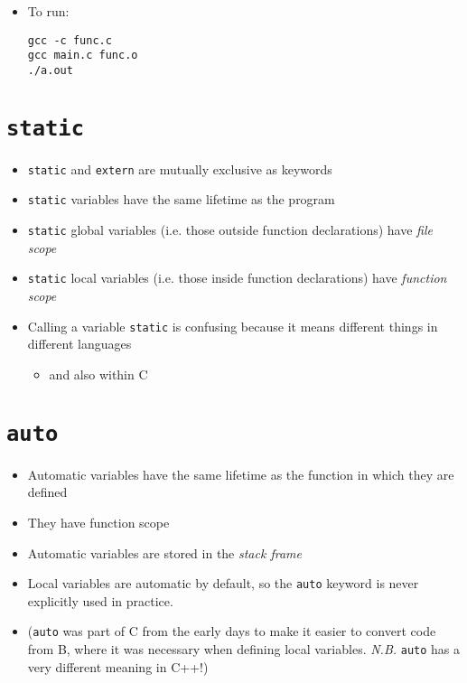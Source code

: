 \documentclass{article}
\begin{document}
\begin{itemize}
\item To run:
\begin{verbatim}
gcc -c func.c
gcc main.c func.o
./a.out
\end{verbatim}
\end{itemize}



\section{\texttt{static}}
\begin{itemize}
\item \verb!static! and \verb!extern! are mutually exclusive as keywords
\item \verb!static! variables have the same lifetime as the program
\item \verb!static! global variables (i.e. those outside function declarations)
 have \emph{file scope}
\item \verb!static! local variables (i.e. those inside function declarations) have \emph{function scope}
\item Calling a variable \verb!static! is confusing because it means different things in different languages
\begin{itemize}
\item and also within C
\end{itemize}
\end{itemize}



\section{\texttt{auto}}
\begin{itemize}
\item Automatic variables have the same lifetime as the function in which they are defined
\item They have function scope
\item Automatic variables are stored in the \emph{stack frame}
\item Local variables are automatic by default, so the \verb!auto! keyword is never explicitly used in practice.
\item (\verb!auto! was part of C from the early days to make it easier to convert code from B, where it was necessary when defining local variables. \emph{N.B.} \verb!auto! has a very different meaning in C++!)
\end{itemize}
\end{document}

